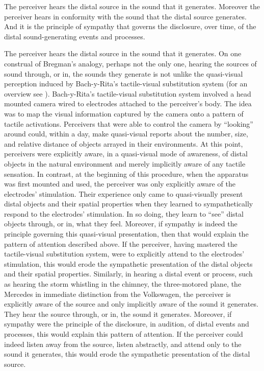 The perceiver hears the distal source in the sound that it generates. Moreover the perceiver hears in conformity with the sound that the distal source generates. And it is the principle of sympathy that governs the disclosure, over time, of the distal sound-generating events and processes.

The perceiver hears the distal source in the sound that it generates. On one construal of Bregman's analogy, perhaps not the only one, hearing the sources of sound through, or in, the sounds they generate is not unlike the quasi-visual perception induced by Bach-y-Rita's tactile-visual substitution system (for an overview see \citealt{Bach-y-Rita:2002jk}). Bach-y-Rita's tactile-visual substitution system involved a head mounted camera wired to electrodes attached to the perceiver's body. The idea was to map the visual information captured by the camera onto a pattern of tactile activations. Perceivers that were able to control the camera by ``looking'' around could, within a day, make quasi-visual reports about the number, size, and relative distance of objects arrayed in their environments. At this point, perceivers were explicitly aware, in a quasi-visual mode of awareness, of distal objects in the natural environment and merely implicitly aware of any tactile sensation. In contrast, at the beginning of this procedure, when the apparatus was first mounted and used, the perceiver was only explicitly aware of the electrodes' stimulation. Their experience only came to quasi-visually present distal objects and their spatial properties when they learned to sympathetically respond to the electrodes' stimulation. In so doing, they learn to ``see'' distal objects through, or in, what they feel. Moreover, if sympathy is indeed the principle governing this quasi-visual presentation, then that would explain the pattern of attention described above. If the perceiver, having mastered the tactile-visual substitution system, were to explicitly attend to the electrodes' stimulation, this would erode the sympathetic presentation of the distal objects and their spatial properties. Similarly, in hearing a distal event or process, such as hearing the storm whistling in the chimney, the three-motored plane, the Mercedes in immediate distinction from the Volkswagen, the perceiver is explicitly aware of the source and only implicitly aware of the sound it generates. They hear the source through, or in, the sound it generates. Moreover, if sympathy were the principle of the disclosure, in audition, of distal events and processes, this would explain this pattern of attention. If the perceiver could indeed listen away from the source, listen abstractly, and attend only to the sound it generates, this would erode the sympathetic presentation of the distal source. 

